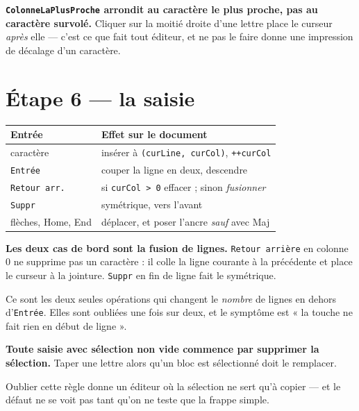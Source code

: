 \begin{nkretenir}
\textbf{\texttt{ColonneLaPlusProche} arrondit au caractère le plus proche, pas au
caractère survolé.} Cliquer sur la moitié droite d'une lettre place le curseur
\emph{après} elle --- c'est ce que fait tout éditeur, et ne pas le faire donne
une impression de décalage d'un caractère.
\end{nkretenir}

\section{Étape 6 --- la saisie}

\begin{center}
\begin{tabular}{@{}ll@{}}
\toprule
\textbf{Entrée} & \textbf{Effet sur le document} \\
\midrule
caractère & insérer à \texttt{(curLine, curCol)}, \texttt{++curCol} \\
\texttt{Entrée} & couper la ligne en deux, descendre \\
\texttt{Retour arr.} & si \texttt{curCol > 0} effacer ; sinon \emph{fusionner} \\
\texttt{Suppr} & symétrique, vers l'avant \\
flèches, Home, End & déplacer, et poser l'ancre \emph{sauf} avec Maj \\
\bottomrule
\end{tabular}
\end{center}

\begin{nkretenir}
\textbf{Les deux cas de bord sont la fusion de lignes.} \texttt{Retour arrière}
en colonne 0 ne supprime pas un caractère : il colle la ligne courante à la
précédente et place le curseur à la jointure. \texttt{Suppr} en fin de ligne fait
le symétrique.

Ce sont les deux seules opérations qui changent le \emph{nombre} de lignes en
dehors d'\texttt{Entrée}. Elles sont oubliées une fois sur deux, et le symptôme
est « la touche ne fait rien en début de ligne ».
\end{nkretenir}

\begin{nkpiege}
\textbf{Toute saisie avec sélection non vide commence par supprimer la
sélection.} Taper une lettre alors qu'un bloc est sélectionné doit le remplacer.

Oublier cette règle donne un éditeur où la sélection ne sert qu'à copier --- et
le défaut ne se voit pas tant qu'on ne teste que la frappe simple.
\end{nkpiege}

